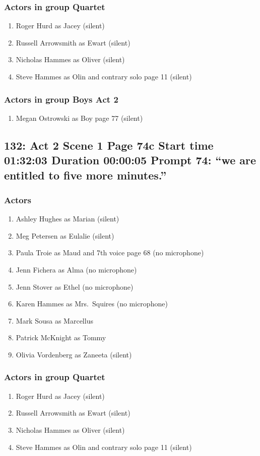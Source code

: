 \subsubsection{Actors in group Quartet}
\begin{enumerate}
\item Roger Hurd as Jacey (silent)
\item Russell Arrowsmith as Ewart (silent)
\item Nicholas Hammes as Oliver (silent)
\item Steve Hammes as Olin and contrary solo page 11 (silent)
\end{enumerate}
\subsubsection{Actors in group Boys Act 2}
\begin{enumerate}
\item Megan Ostrowski as Boy page 77 (silent)
\end{enumerate}


\subsection{132: Act 2 Scene 1 Page 74c Start time 01:32:03 Duration 00:00:05 Prompt 74: ``we are entitled to five more minutes.''}

\subsubsection{Actors}
\begin{enumerate}
\item Ashley Hughes as Marian (silent)
\item Meg Petersen as Eulalie (silent)
\item Paula Troie as Maud and 7th voice page 68 (no microphone)
\item Jenn Fichera as Alma (no microphone)
\item Jenn Stover as Ethel (no microphone)
\item Karen Hammes as Mrs.~Squires (no microphone)
\item Mark Sousa as Marcellus
\item Patrick McKnight as Tommy
\item Olivia Vordenberg as Zaneeta (silent)
\end{enumerate}
\subsubsection{Actors in group Quartet}
\begin{enumerate}
\item Roger Hurd as Jacey (silent)
\item Russell Arrowsmith as Ewart (silent)
\item Nicholas Hammes as Oliver (silent)
\item Steve Hammes as Olin and contrary solo page 11 (silent)
\end{enumerate}
